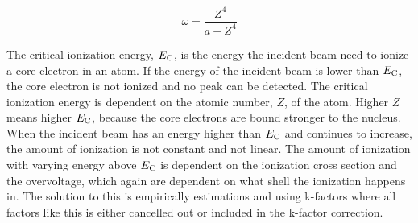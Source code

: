 \begin{equation}
    \label{eq:empirical:fluorescentyieldapprox}
    \omega = \frac{Z^4}{a + Z^4}
\end{equation}

The critical ionization energy, $E_\textnormal{C}$, is the energy the incident beam need to ionize a core electron in an atom.
If the energy of the incident beam is lower than $E_\textnormal{C}$, the core electron is not ionized and no peak can be detected.
The critical ionization energy is dependent on the atomic number, $Z$, of the atom.
Higher $Z$ means higher $E_\textnormal{C}$, because the core electrons are bound stronger to the nucleus.
When the incident beam has an energy higher than $E_\textnormal{C}$ and continues to increase, the amount of ionization is not constant and not linear.
The amount of ionization with varying energy above $E_\textnormal{C}$ is dependent on the ionization cross section and the overvoltage, which again are dependent on what shell the ionization happens in.
The solution to this is empirically estimations and using k-factors where all factors like this is either cancelled out or included in the k-factor correction.



